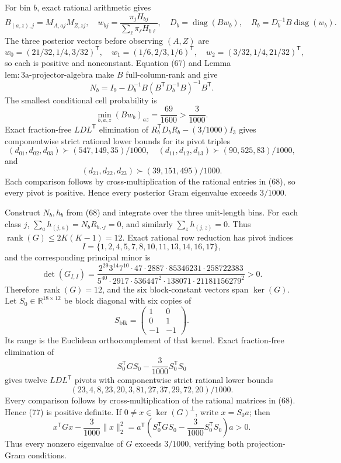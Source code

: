 For bin \(b\), exact rational arithmetic gives
\[
 B_{(a,z),j}=M_{A,aj}M_{Z,zj},\quad
 w_{bj}=\frac{\pi_jH_{bj}}{\sum_\ell\pi_\ell H_{b\ell}},\quad
 D_b=\operatorname{diag}(Bw_b),\quad
 R_b=D_b^{-1}B\operatorname{diag}(w_b). \tag{68}
\]
The three posterior vectors before observing \((A,Z)\) are
\[
 w_0=(21/32,1/4,3/32)^{\mathsf T},\quad
 w_1=(1/6,2/3,1/6)^{\mathsf T},\quad
 w_2=(3/32,1/4,21/32)^{\mathsf T}, \tag{69}
\]
so each is positive and nonconstant.  Equation (67) and Lemma \(\mathrm{lem{:}3a\mbox{-}projector\mbox{-}algebra}\) make \(B\) full-column-rank and give
\[
 N_b=I_9-D_b^{-1}B(B^{\mathsf T}D_b^{-1}B)^{-1}B^{\mathsf T}. \tag{70}
\]
The smallest conditional cell probability is
\[
 \min_{b,a,z}(Bw_b)_{az}=\frac{69}{1600}>\frac3{1000}. \tag{71}
\]
Exact fraction-free \(LDL^{\mathsf T}\) elimination of
\(R_b^{\mathsf T}D_bR_b-(3/1000)I_3\) gives componentwise strict rational lower bounds for its pivot triples
\[
 (d_{01},d_{02},d_{03})\succ(547,149,35)/1000,\quad
 (d_{11},d_{12},d_{13})\succ(90,525,83)/1000, \tag{72}
\]
and
\[
 (d_{21},d_{22},d_{23})\succ(39,151,495)/1000. \tag{73}
\]
Each comparison follows by cross-multiplication of the rational entries in (68), so every pivot is positive.  Hence every posterior Gram eigenvalue exceeds \(3/1000\).

Construct \(N_b,h_b\) from (68) and integrate over the three unit-length bins.  For each class \(j\),
\(\sum_a h_{(j,a)}=N_bR_{b,\cdot j}=0\), and similarly
\(\sum_z h_{(j,z)}=0\).  Thus \(\operatorname{rank}(G)\leq2K(K-1)=12\).  Exact rational row reduction has pivot indices
\[
 I=\{1,2,4,5,7,8,10,11,13,14,16,17\}, \tag{74}
\]
and the corresponding principal minor is
\[
 \det(G_{I,I})=
 \frac{2^{29}3^{14}7^{10}\cdot47\cdot2887\cdot85346231\cdot258722383}
 {5^{40}\cdot2917\cdot536447^2\cdot138071\cdot21181156279^2}>0. \tag{75}
\]
Therefore \(\operatorname{rank}(G)=12\), and the six block-constant vectors span \(\ker(G)\).  Let \(S_0\in\mathbb R^{18\times12}\) be block diagonal with six copies of
\[
 S_{\mathrm{blk}}=
 \begin{pmatrix}1&0\\0&1\\-1&-1\end{pmatrix}. \tag{76}
\]
Its range is the Euclidean orthocomplement of that kernel.  Exact fraction-free elimination of
\[
 S_0^{\mathsf T}GS_0-\frac3{1000}S_0^{\mathsf T}S_0 \tag{77}
\]
gives twelve \(LDL^{\mathsf T}\) pivots with componentwise strict rational lower bounds
\[
 (23,4,8,23,20,3,81,27,37,29,72,20)/1000. \tag{78}
\]
Every comparison follows by cross-multiplication of the rational matrices in (68).  Hence (77) is positive definite.  If \(0\ne x\in\ker(G)^\perp\), write \(x=S_0a\); then
\[
 x^{\mathsf T}Gx-\frac3{1000}\|x\|_2^2
 =a^{\mathsf T}\left(S_0^{\mathsf T}GS_0-\frac3{1000}S_0^{\mathsf T}S_0\right)a>0. \tag{79}
\]
Thus every nonzero eigenvalue of \(G\) exceeds \(3/1000\), verifying both projection-Gram conditions.

